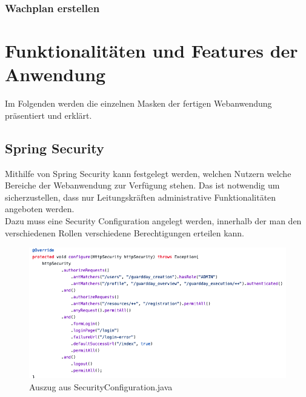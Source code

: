 \documentclass[fontsize=12pt,openright,oneside,paper=a4,BCOR=1cm]{scrbook}
\begin{document}

\subsubsection{Wachplan erstellen}






\section{Funktionalitäten und Features der Anwendung}

Im Folgenden werden die einzelnen Masken der fertigen Webanwendung präsentiert und erklärt.

\subsection{Spring Security}

Mithilfe von Spring Security kann festgelegt werden, welchen Nutzern welche Bereiche der Webanwendung zur Verf\"ugung stehen. Das ist notwendig um sicherzustellen, dass nur Leitungskr\"aften administrative Funktionalit\"aten angeboten werden. \\
Dazu muss eine \glqq Security Configuration\grqq{} angelegt werden, innerhalb der man den verschiedenen Rollen verschiedene Berechtigungen erteilen kann.
\begin{figure}[H]
  \centering
    \includegraphics[width=0.7\linewidth]{Anlagen/Code/SecurityConfiguration.png}
    \caption{Auszug aus SecurityConfiguration.java}
  \label{fig:securityConfiguration}
\end{figure}
\end{document}
